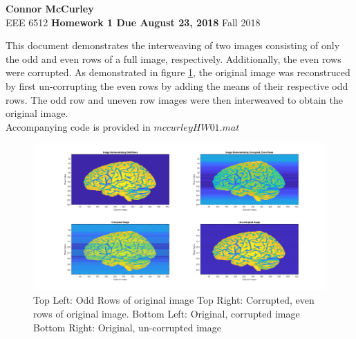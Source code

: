 \documentclass{article}[12 pt]
\begin{document}
	
\begin{center}
	\textbf{\Large Connor McCurley} \\
	EEE 6512 \qquad \textbf{\large Homework 1 Due August 23, 2018} \qquad Fall 2018 
\end{center}


This document demonstrates the interweaving of two images consisting of only the odd and even rows of a full image, respectively.  Additionally, the even rows were corrupted.  As demonstrated in figure \ref{fig:images}, the original image was reconstruced by first un-corrupting the even rows by adding the means of their respective odd rows.  The odd row and uneven row images were then interweaved to obtain the original image. \\
 
 \noindent Accompanying code is provided in $mccurleyHW01.mat$

\begin{center}
	\begin{figure}[h]
		\centering
		\includegraphics[width=\textwidth]{"hw01_images"}
		\caption{Top Left: Odd Rows of original image Top Right: Corrupted, even rows of original image. Bottom Left: Original, corrupted image Bottom Right: Original, un-corrupted image}
		\label{fig:images}
	\end{figure}
\end{center}
\end{document}
